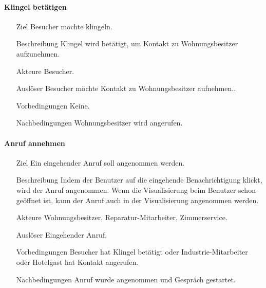 \paragraph{Klingel betätigen}
    \begin{itemize}
        \item[Ziel]
        Besucher möchte klingeln.
        \item[Beschreibung]
        Klingel wird betätigt, um Kontakt zu Wohnungsbesitzer aufzunehmen.
        \item[Akteure]
        Besucher.
        \item[Auslöser]
        Besucher möchte Kontakt zu Wohnungsbesitzer aufnehmen..
        \item[Vorbedingungen]
        Keine.
        \item[Nachbedingungen]
        Wohnungsbesitzer wird angerufen.
        \end{itemize}

\paragraph{Anruf annehmen}
    \begin{itemize}
        \item[Ziel]
        Ein eingehender Anruf soll angenommen werden.
        \item[Beschreibung]
        Indem der Benutzer auf die eingehende Benachrichtigung klickt, wird der Anruf angenommen.
        Wenn die Visualisierung beim Benutzer schon geöffnet ist, kann der Anruf auch in der Visualisierung angenommen werden.
        \item[Akteure]
        Wohnungsbesitzer, Reparatur-Mitarbeiter, Zimmerservice.
        \item[Auslöser]
        Eingehender Anruf.
        \item[Vorbedingungen]
        Besucher hat Klingel betätigt oder Industrie-Mitarbeiter oder Hotelgast hat Kontakt angerufen.
        \item[Nachbedingungen]
        Anruf wurde angenommen und Gespräch gestartet.
        \end{itemize}


